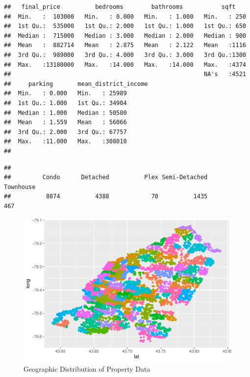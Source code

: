 \documentclass[11pt,]{article}
\begin{document}
\begin{verbatim}
##   final_price          bedrooms        bathrooms           sqft     
##  Min.   :  103000   Min.   : 0.000   Min.   : 1.000   Min.   : 250  
##  1st Qu.:  535000   1st Qu.: 2.000   1st Qu.: 1.000   1st Qu.: 650  
##  Median :  715000   Median : 3.000   Median : 2.000   Median : 900  
##  Mean   :  882714   Mean   : 2.875   Mean   : 2.122   Mean   :1116  
##  3rd Qu.:  989000   3rd Qu.: 4.000   3rd Qu.: 3.000   3rd Qu.:1300  
##  Max.   :13180000   Max.   :14.000   Max.   :14.000   Max.   :4374  
##                                                       NA's   :4521  
##     parking       mean_district_income
##  Min.   : 0.000   Min.   : 25989      
##  1st Qu.: 1.000   1st Qu.: 34904      
##  Median : 1.000   Median : 50580      
##  Mean   : 1.559   Mean   : 56066      
##  3rd Qu.: 2.000   3rd Qu.: 67757      
##  Max.   :11.000   Max.   :308010      
## 
\end{verbatim}

\begin{verbatim}
## 
##         Condo      Detached          Plex Semi-Detached     Townhouse 
##          8874          4388            70          1435           467
\end{verbatim}

\begin{figure}

{\centering \includegraphics{House_prices_report_files/figure-latex/map-1} 

}

\caption{Geographic Distribution of Property Data\label{sec:map}}\label{fig:map}
\end{figure}
\end{document}
